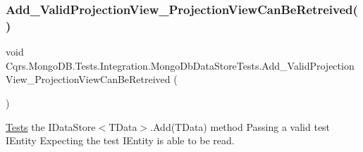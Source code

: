 \subsubsection{\texorpdfstring{Add\+\_\+\+Valid\+Projection\+View\+\_\+\+Projection\+View\+Can\+Be\+Retreived()}{Add\_ValidProjectionView\_ProjectionViewCanBeRetreived()}}
{\footnotesize\ttfamily void Cqrs.\+Mongo\+D\+B.\+Tests.\+Integration.\+Mongo\+Db\+Data\+Store\+Tests.\+Add\+\_\+\+Valid\+Projection\+View\+\_\+\+Projection\+View\+Can\+Be\+Retreived (\begin{DoxyParamCaption}{ }\end{DoxyParamCaption})}



\hyperlink{namespaceCqrs_1_1MongoDB_1_1Tests}{Tests} the I\+Data\+Store$<$\+T\+Data$>$.\+Add(\+T\+Data) method Passing a valid test I\+Entity Expecting the test I\+Entity is able to be read. 

